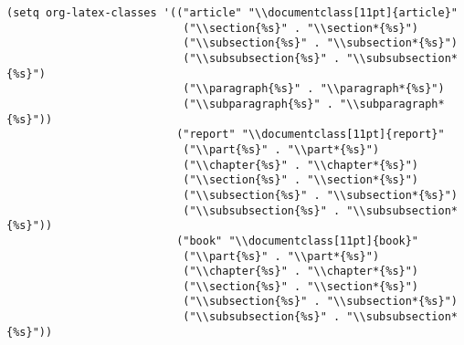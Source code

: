 \documentclass[8pt]{article}
\begin{document}
\begin{verbatim}
(setq org-latex-classes '(("article" "\\documentclass[11pt]{article}"
                           ("\\section{%s}" . "\\section*{%s}")
                           ("\\subsection{%s}" . "\\subsection*{%s}")
                           ("\\subsubsection{%s}" . "\\subsubsection*{%s}")
                           ("\\paragraph{%s}" . "\\paragraph*{%s}")
                           ("\\subparagraph{%s}" . "\\subparagraph*{%s}"))
                          ("report" "\\documentclass[11pt]{report}"
                           ("\\part{%s}" . "\\part*{%s}")
                           ("\\chapter{%s}" . "\\chapter*{%s}")
                           ("\\section{%s}" . "\\section*{%s}")
                           ("\\subsection{%s}" . "\\subsection*{%s}")
                           ("\\subsubsection{%s}" . "\\subsubsection*{%s}"))
                          ("book" "\\documentclass[11pt]{book}"
                           ("\\part{%s}" . "\\part*{%s}")
                           ("\\chapter{%s}" . "\\chapter*{%s}")
                           ("\\section{%s}" . "\\section*{%s}")
                           ("\\subsection{%s}" . "\\subsection*{%s}")
                           ("\\subsubsection{%s}" . "\\subsubsection*{%s}"))

\end{verbatim}
\end{document}
